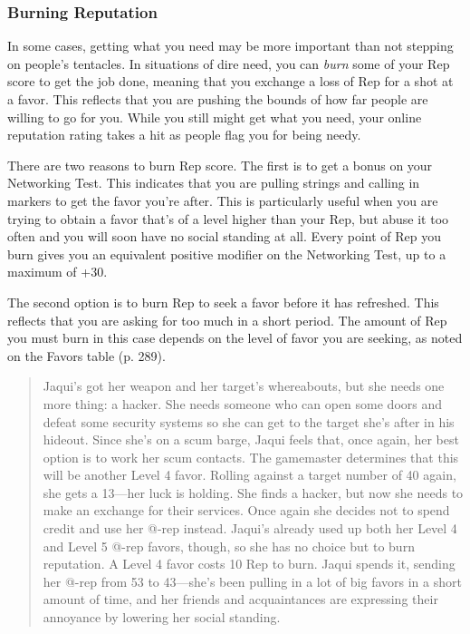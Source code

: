 \subsubsection{Burning Reputation}

In some cases, getting what you need may be more 
important than not stepping on people's tentacles. In 
situations of dire need, you can \textit{burn }some of your 
Rep score to get the job done, meaning that you exchange
a loss of Rep for a shot at a favor. This reflects
that you are pushing the bounds of how far people are 
willing to go for you. While you still might get what 
you need, your online reputation rating takes a hit as 
people flag you for being needy.

There are two reasons to burn Rep score. The first 
is to get a bonus on your Networking Test. This indicates
that you are pulling strings and calling in markers
to get the favor you're after. This is particularly
useful when you are trying to obtain a favor that's of 
a level higher than your Rep, but abuse it too often 
and you will soon have no social standing at all. Every 
point of Rep you burn gives you an equivalent positive
modifier on the Networking Test, up to a maximum
of +30.

The second option is to burn Rep to seek a favor 
before it has refreshed. This reflects that you are asking 
for too much in a short period. The amount of Rep 
you must burn in this case depends on the level of favor 
you are seeking, as noted on the Favors table (p. 289).

\begin{quotation}
Jaqui’s got her weapon and her target’s whereabouts,
but she needs one more thing: a hacker.
She needs someone who can open some doors
and defeat some security systems so she can get
to the target she’s after in his hideout. Since she’s
on a scum barge, Jaqui feels that, once again, her
best option is to work her scum contacts. The
gamemaster determines that this will be another
Level 4 favor. Rolling against a target number of
40 again, she gets a 13—her luck is holding.
She finds a hacker, but now she needs to make
an exchange for their services. Once again she
decides not to spend credit and use her @-rep
instead. Jaqui’s already used up both her Level 4
and Level 5 @-rep favors, though, so she has no
choice but to burn reputation. A Level 4 favor costs
10 Rep to burn. Jaqui spends it, sending her @-rep
from 53 to 43—she’s been pulling in a lot of big
favors in a short amount of time, and her friends
and acquaintances are expressing their annoyance
by lowering her social standing.
\end{quotation}

